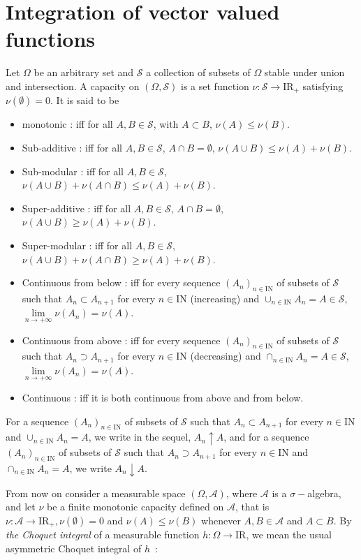 \documentclass[preprint,authoryear,12pt]{article}%
\theoremstyle{definition}
\renewcommand{\AA}{{\mathcal A}}
\newcommand{\IR}{{\mathrm{I\!R}}}
\newcommand{\IN}{{\mathrm{I\!N}}}
\renewcommand{\SS}{{\mathscr S}}
\begin{document}
\section{Integration of vector valued functions}
Let $\Omega$ be an arbitrary set and $\SS$ a collection of subsets of $\Omega$ stable under union and intersection. A capacity on $(\Omega,\SS)$ is a set function $\nu : \SS\rightarrow \IR_+$ satisfying $\nu(\emptyset)=0$. It is said to be 
\begin{itemize}
\item monotonic : iff for all $A,B\in \SS$, with $A\subset B$, $\nu(A)\leq \nu(B)$.
\item Sub-additive : iff for all $A,B\in \SS$, $A\cap B=\emptyset$,  $\nu(A\cup B)\leq \nu(A)+\nu(B)$.
\item Sub-modular : iff for all $A,B\in \SS$,  $\nu(A\cup B)+\nu(A\cap B)\leq \nu(A)+\nu(B)$.
\item Super-additive : iff for all $A,B\in \SS$, $A\cap B=\emptyset$,  $\nu(A\cup B)\geq \nu(A)+\nu(B)$.
\item Super-modular : iff for all $A,B\in \SS$,  $\nu(A\cup B)+\nu(A\cap B)\geq \nu(A)+\nu(B)$.
\item Continuous from below : iff for every sequence $(A_n)_{n\in \IN}$ of subsets of $\SS$ such that $A_n\subset A_{n+1}$ for every $n\in \IN$ (increasing) and $\cup_{n\in \IN} A_n=A\in \SS$, $\underset{n \rightarrow +\infty}{\lim} \nu(A_n)=\nu(A)$. 
\item Continuous from above : iff for every sequence $(A_n)_{n\in \IN}$ of subsets of $\SS$ such that $A_n\supset A_{n+1}$ for every $n\in \IN$ (decreasing) and $\cap_{n\in \IN} A_n=A\in \SS$, $\underset{n \rightarrow +\infty}{\lim} \nu(A_n)=\nu(A)$. 

\item Continuous : iff it is both continuous from above and from below.
\end{itemize}

For a sequence $(A_n)_{n\in \IN}$ of subsets of $\SS$ such that $A_n\subset A_{n+1}$ for every $n\in \IN$ and $\cup_{n\in \IN} A_n=A$, we write in the sequel, $A_n\uparrow A$, and for a sequence $(A_n)_{n\in \IN}$ of subsets of $\SS$ such that $A_n\supset A_{n+1}$ for every $n\in \IN$ and $\cap_{n\in \IN} A_n=A$, we write  $A_n\downarrow A$.

\medskip
From now on consider a measurable space $(\Omega,\AA)$, where $\AA$ is a $\sigma-$algebra, and let $\nu$ be  a finite monotonic capacity defined on $\AA$, that is $\nu:\AA\rightarrow \IR_{+}, \nu(\emptyset)=0$ and $\nu(A)\leq \nu(B)$ whenever $A,B\in \AA$ and $A\subset B$. By \emph{the Choquet integral} of a measurable function $h :\Omega\rightarrow \IR$, we mean the usual asymmetric Choquet integral of $h$~: 
\end{document}
